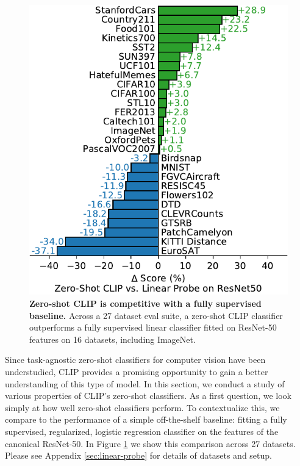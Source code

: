 \documentclass{article}
\begin{document}
\begin{figure}[t]
\begin{center}
\centerline{\includegraphics[width=1.0\columnwidth]{zs-clip-vs-rn50.pdf}}
\caption{\textbf{Zero-shot CLIP is competitive with a fully supervised baseline.} Across a 27 dataset eval suite, a zero-shot CLIP classifier outperforms a fully supervised linear classifier fitted on ResNet-50 features on 16 datasets, including ImageNet.}
\label{zeroshot_vs_supervised}
\end{center}
\vspace{-1em}
\end{figure}

Since task-agnostic zero-shot classifiers for computer vision have been understudied, CLIP provides a promising opportunity to gain a better understanding of this type of model. In this section, we conduct a study of various properties of CLIP's zero-shot classifiers. As a first question, we look simply at how well zero-shot classifiers perform. To contextualize this, we compare to the performance of a simple off-the-shelf baseline: fitting a fully supervised, regularized, logistic regression classifier on the features of the canonical ResNet-50. In Figure \ref{zeroshot_vs_supervised} we show this comparison across 27 datasets. Please see Appendix \ref{sec:linear-probe} for details of datasets and setup. 
\end{document}
